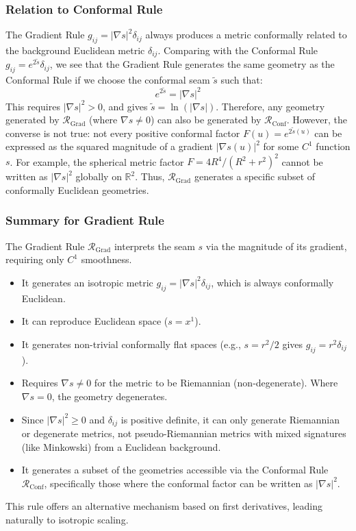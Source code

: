 \documentclass[twoside,twocolumn]{article}
\begin{document}
\subsubsection{Relation to Conformal Rule}
The Gradient Rule $g_{ij} = |\nabla s|^2 \delta_{ij}$ always produces a metric conformally related to the background Euclidean metric $\delta_{ij}$. Comparing with the Conformal Rule $g_{ij} = e^{2\tilde{s}} \delta_{ij}$, we see that the Gradient Rule generates the same geometry as the Conformal Rule if we choose the conformal seam $\tilde{s}$ such that:
$$ e^{2\tilde{s}} = |\nabla s|^2 $$
This requires $|\nabla s|^2 > 0$, and gives $\tilde{s} = \ln(|\nabla s|)$. Therefore, any geometry generated by $\mathcal{R}_{\text{Grad}}$ (where $\nabla s \neq 0$) can also be generated by $\mathcal{R}_{\text{Conf}}$. However, the converse is not true: not every positive conformal factor $F(u) = e^{2\tilde{s}(u)}$ can be expressed as the squared magnitude of a gradient $|\nabla s(u)|^2$ for some $C^1$ function $s$. For example, the spherical metric factor $F = 4R^4 / (R^2+r^2)^2$ cannot be written as $|\nabla s|^2$ globally on $\mathbb{R}^2$. Thus, $\mathcal{R}_{\text{Grad}}$ generates a specific subset of conformally Euclidean geometries.

\subsubsection{Summary for Gradient Rule}
The Gradient Rule \( \mathcal{R}_{\text{Grad}} \) interprets the seam \( s \) via the magnitude of its gradient, requiring only \( C^1 \) smoothness.
\begin{itemize}
    \item It generates an isotropic metric \( g_{ij} = |\nabla s|^2 \delta_{ij} \), which is always conformally Euclidean.
    \item It can reproduce Euclidean space ($s=x^1$).
    \item It generates non-trivial conformally flat spaces (e.g., $s=r^2/2$ gives $g_{ij}=r^2 \delta_{ij}$).
    \item Requires $\nabla s \neq 0$ for the metric to be Riemannian (non-degenerate). Where $\nabla s = 0$, the geometry degenerates.
    \item Since $|\nabla s|^2 \ge 0$ and $\delta_{ij}$ is positive definite, it can only generate Riemannian or degenerate metrics, not pseudo-Riemannian metrics with mixed signatures (like Minkowski) from a Euclidean background.
    \item It generates a subset of the geometries accessible via the Conformal Rule $\mathcal{R}_{\text{Conf}}$, specifically those where the conformal factor can be written as $|\nabla s|^2$.
\end{itemize}
This rule offers an alternative mechanism based on first derivatives, leading naturally to isotropic scaling.
\end{document}
